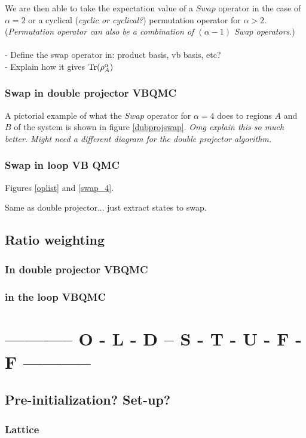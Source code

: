 \documentclass[prb,aps,twocolumn,floatfix,amsmath,amssymb,superscriptaddress,tightenlines]{revtex4}
\begin{document}
We are then able to take the expectation value of a $Swap$ operator in the case of $\alpha = 2$ or a cyclical ({\it cyclic or cyclical?}) permutation operator for $\alpha > 2$. 
({\it Permutation operator can also be a combination of $(\alpha - 1)$ Swap operators}.)
\\\\
- Define the swap operator in: product basis, vb basis, etc?\\
- Explain how it gives ${\rm Tr} (\rho_A^{\alpha})$

\subsubsection{Swap in double projector VBQMC}
A pictorial example of what the $Swap$ operator for $\alpha = 4$ does to regions $A$ and $B$ of the system is shown in figure \ref{dubprojswap}. {\it Omg explain this so much better.  Might need a different diagram for the double projector algorithm.}

\subsubsection{Swap in  loop VB QMC}
Figures \ref{oplist} and \ref{swap_4}.

Same as double projector... just extract states to swap.

\subsection{Ratio weighting}

\subsubsection{In double projector VBQMC}
\subsubsection{in the loop VBQMC}

\section{----------- O - L - D -- S - T - U - F - F -----------}
\subsection{Pre-initialization? Set-up? }
 
\subsubsection{Lattice}
	
\end{document}
